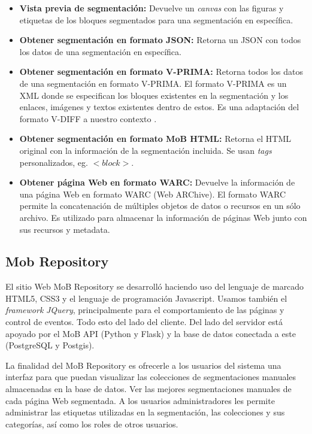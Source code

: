 \documentclass[10pt]{revecom}
\begin{document}
\begin{itemize}
\item \textbf{Vista previa de segmentación:} Devuelve un \textit{canvas} con las figuras y etiquetas de los bloques segmentados para una segmentación en específica.

\item \textbf{Obtener segmentación en formato JSON:} Retorna un JSON con todos los datos de una segmentación en específica. 

\item \textbf{Obtener segmentación en formato V-PRIMA:} Retorna todos los datos de una segmentación en formato V-PRIMA. El formato V-PRIMA es un XML donde se especifican los bloques existentes en la segmentación y los enlaces, imágenes y textos existentes dentro de estos. Es una adaptación del formato V-DIFF a nuestro contexto \cite{Pehlivan:DEXA:2010}.

\item \textbf{Obtener segmentación en formato MoB HTML:} Retorna el HTML original con la información de la segmentación incluida. Se usan \emph{tags} personalizados, eg. $<block>$.

\item \textbf{Obtener página Web en formato WARC:} Devuelve la información de una página Web en formato WARC (Web ARChive). El formato WARC permite la concatenación de múltiples objetos de datos o recursos en un sólo archivo. Es utilizado para almacenar la información de páginas Web junto con sus recursos y metadata.

\end{itemize}

\subsection{Mob Repository}
El sitio Web MoB Repository se desarrolló haciendo uso del lenguaje de marcado HTML5, CSS3 y el lenguaje de programación Javascript. 
Usamos también el \textit{framework} \textit{JQuery}, principalmente para el comportamiento de las páginas y control de eventos. 
Todo esto del lado del cliente. 
Del lado del servidor está apoyado por el MoB API (Python y Flask) y la base de datos conectada a este (PostgreSQL y Postgis).

La finalidad del MoB Repository es ofrecerle a los usuarios del sistema una interfaz para que puedan visualizar las colecciones de segmentaciones manuales almacenadas en la base de datos. Ver las mejores segmentaciones manuales de cada página Web segmentada. 
A los usuarios administradores les permite administrar las etiquetas utilizadas en la segmentación, las colecciones y sus categorías, así como los roles de otros usuarios. 
\end{document}
